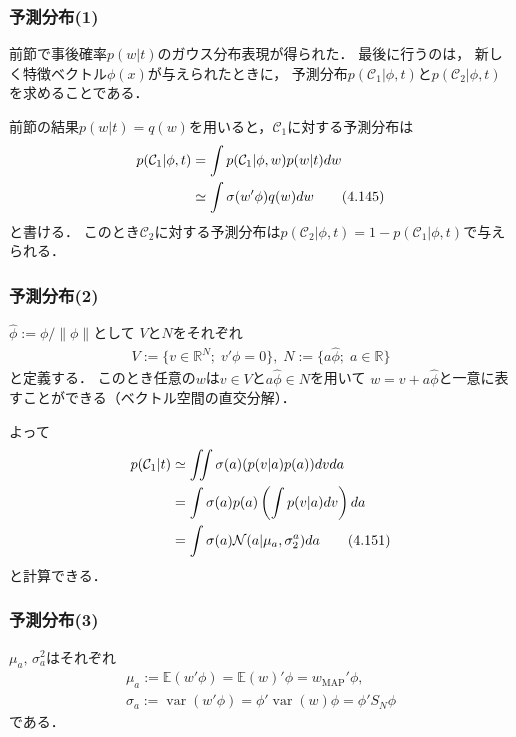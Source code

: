 \documentclass[10pt,hyperref={unicode}]{beamer}
\DeclareMathOperator*{\var}{var}
\begin{document}
\begin{frame}
    \frametitle{予測分布(1)}
    前節で事後確率$p(w|t)$のガウス分布表現が得られた．
    最後に行うのは，
    新しく特徴ベクトル$\phi(x)$が与えられたときに，
    予測分布$p(\mathcal{C}_1|\phi,t)$と$p(\mathcal{C}_2|\phi,t)$を求めることである．

    \bigskip

    前節の結果$p(w|t)=q(w)$を用いると，$\mathcal{C}_1$に対する予測分布は
    \begin{align}
        p(\mathcal{C}_1|\phi,t) &= \int p(\mathcal{C}_1|\phi,w)p(w|t)dw \notag \\
                                &\simeq \int \sigma(w'\phi)q(w)dw \tag{4.145}
    \end{align}
    と書ける．
    このとき$\mathcal{C}_2$に対する予測分布は$p(\mathcal{C}_2|\phi,t) = 1 - p(\mathcal{C}_1|\phi,t)$で与えられる．

\end{frame}

\begin{frame}
    \frametitle{予測分布(2)}
    $\hat{\phi}:=\phi/\|\phi\|$として
    $V$と$N$をそれぞれ
    \begin{gather*}
        V := \{v \in \mathbb{R}^N;\; v'\phi =0 \},\;
        N := \{a\hat{\phi};\;a \in \mathbb{R}\}
    \end{gather*}
    と定義する．
    このとき任意の$w$は$v \in V$と$a\hat{\phi}\in N$を用いて
    $w = v + a\hat{\phi}$と一意に表すことができる（ベクトル空間の直交分解）．

    \bigskip

    よって
    \begin{align}
        p(\mathcal{C}_1|t)
        &\simeq \iint \sigma(a) (p(v|a)p(a))dvda \notag \\
        &= \int \sigma(a)p(a) \left(\int p(v|a) dv\right)da \notag \\
        &= \int \sigma(a)\mathcal{N}(a|\mu_a,\sigma_2^a)da \label{pc1t}
        \tag{4.151}
    \end{align}
    と計算できる．
\end{frame}

\begin{frame}
    \frametitle{予測分布(3)}
    $\mu_a,\,\sigma_a^2$はそれぞれ
    \begin{gather*}
        \mu_a := \mathbb{E}(w'\phi) = \mathbb{E}(w)'\phi = w_\mathrm{MAP}'\phi,\\
        \sigma_a := \var(w'\phi) = \phi'\var(w)\phi = \phi' S_N \phi
    \end{gather*}
    である．

\end{frame}
\end{document}
